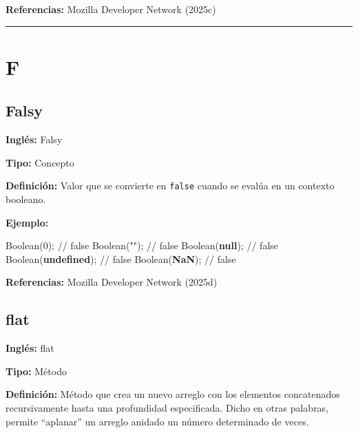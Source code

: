 \documentclass[
  letterpaper,
  DIV=11,
  numbers=noendperiod]{scrreprt}
\newenvironment{Shaded}{\begin{snugshade}}{\end{snugshade}}
\newcommand{\BuiltInTok}[1]{\textcolor[rgb]{0.00,0.23,0.31}{#1}}
\newcommand{\CommentTok}[1]{\textcolor[rgb]{0.37,0.37,0.37}{#1}}
\newcommand{\DecValTok}[1]{\textcolor[rgb]{0.68,0.00,0.00}{#1}}
\newcommand{\KeywordTok}[1]{\textcolor[rgb]{0.00,0.23,0.31}{\textbf{#1}}}
\newcommand{\NormalTok}[1]{\textcolor[rgb]{0.00,0.23,0.31}{#1}}
\newcommand{\OperatorTok}[1]{\textcolor[rgb]{0.37,0.37,0.37}{#1}}
\newcommand{\StringTok}[1]{\textcolor[rgb]{0.13,0.47,0.30}{#1}}
\let\oldsubsection\subsection
\renewcommand{\subsection}{\phantomsection\oldsubsection}
\begin{document}
\textbf{Referencias:} Mozilla Developer Network (2025c)

\begin{center}\rule{0.5\linewidth}{0.5pt}\end{center}

\section*{F}\label{f}


\subsection*{Falsy}\label{glos-falsy}

\textbf{Inglés:} Falsy

\textbf{Tipo:} Concepto

\textbf{Definición:} Valor que se convierte en \texttt{false} cuando se
evalúa en un contexto booleano.

\textbf{Ejemplo:}

\begin{Shaded}
\begin{Highlighting}[]
\BuiltInTok{Boolean}\NormalTok{(}\DecValTok{0}\NormalTok{)}\OperatorTok{;}         \CommentTok{// false}
\BuiltInTok{Boolean}\NormalTok{(}\StringTok{""}\NormalTok{)}\OperatorTok{;}        \CommentTok{// false}
\BuiltInTok{Boolean}\NormalTok{(}\KeywordTok{null}\NormalTok{)}\OperatorTok{;}      \CommentTok{// false}
\BuiltInTok{Boolean}\NormalTok{(}\KeywordTok{undefined}\NormalTok{)}\OperatorTok{;} \CommentTok{// false}
\BuiltInTok{Boolean}\NormalTok{(}\KeywordTok{NaN}\NormalTok{)}\OperatorTok{;}       \CommentTok{// false}
\end{Highlighting}
\end{Shaded}

\textbf{Referencias:} Mozilla Developer Network (2025d)

\subsection*{flat}\label{glos-flat}

\textbf{Inglés:} flat

\textbf{Tipo:} Método

\textbf{Definición:} Método que crea un nuevo arreglo con los elementos
concatenados recursivamente hasta una profundidad especificada. Dicho en
otras palabras, permite ``aplanar'' un arreglo anidado un número
determinado de veces.
\end{document}
